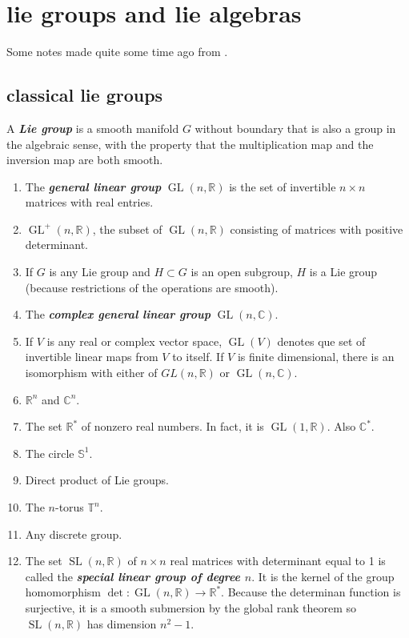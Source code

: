 \section{lie groups and lie algebras}

Some notes made quite some time ago from  \cite{les}.

\subsection{classical lie groups}
\begin{defn}
	A \textbf{\textit{Lie group}} is a smooth manifold $G$ without boundary that is also a group in the algebraic sense, with the property that the multiplication map and the inversion map are both smooth.
\end{defn}
\begin{example}\leavevmode
	\begin{enumerate}
		\item The \textbf{\textit{general linear group}} $\operatorname{GL}(n,\mathbb{R})$ is the set of invertible $n\times n$ matrices with real entries.
		\item $\operatorname{GL}^+(n,\mathbb{R})$, the subset of $\operatorname{GL}(n,\mathbb{R})$ consisting of matrices with positive determinant.
		\item If $G$ is any Lie group and $H\subset G$ is an open subgroup, $H$ is a Lie group (because restrictions of the operations are smooth).
		\item The \textbf{\textit{complex general linear group}} $\operatorname{GL}(n,\mathbb{C})$.
		\item If $V$ is any real or complex vector space, $\operatorname{GL}(V)$ denotes que set of invertible linear maps from $V$ to itself. If $V$ is finite dimensional, there is an isomorphism with either of $GL(n,\mathbb{R})$ or $\operatorname{GL}(n,\mathbb{C})$.
		\item $\mathbb{R}^n$ and $\mathbb{C}^n$.
		\item The set $\mathbb{R}^*$ of nonzero real numbers. In fact, it is $\operatorname{GL}(1,\mathbb{R})$. Also $\mathbb{C}^*$.
		\item The circle $\mathbb{S}^1$.
		\item Direct product of Lie groups.
		\item The $n$-torus $\mathbb{T}^n$.
		\item Any discrete group.
		\item The set $\operatorname{SL}(n,\mathbb{R})$ of $n\times n$ real matrices with determinant equal to 1 is called the \textbf{\textit{special linear group of degree $n$}}. It is the kernel of the group homomorphism $\det:\operatorname{GL}(n,\mathbb{R})\to\mathbb{R}^*$. Because the determinan function is surjective, it is a smooth submersion by the global rank theorem so $\operatorname{SL}(n,\mathbb{R})$ has dimension $n^2-1$.

\end{enumerate}
\end{example}
